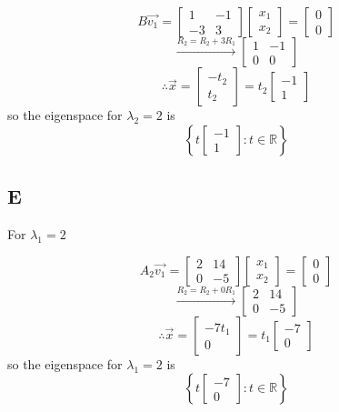 \documentclass{article}
\begin{document}
\[
	B \vec{v_1} =
	\begin{bmatrix}
		1  & -1 \\
		-3 & 3
	\end{bmatrix}
	\begin{bmatrix}
		x_1 \\
		x_2
	\end{bmatrix}
	=
	\begin{bmatrix}
		0 \\0
	\end{bmatrix}
\]
\[
	\xrightarrow{R_2 = R_2 + 3R_1}
	\begin{bmatrix}
		1 & -1 \\
		0 & 0
	\end{bmatrix}
\]
\[
	\therefore \vec{x} = \begin{bmatrix}
		-t_2 \\
		t_2
	\end{bmatrix}
	= t_2 \begin{bmatrix}
		-1 \\
		1
	\end{bmatrix}
\]
so the eigenspace for \(\lambda_2 = 2\) is
\[
	\left\{ t \begin{bmatrix}
		-1 \\
		1
	\end{bmatrix} : t \in \mathbb{R} \right\}
\]

\subsection*{E}

For \(\lambda_1 = 2\)

\[
    A_2 \vec{v_1} =
    \begin{bmatrix}
        2  & 14 \\
        0 & -5
    \end{bmatrix}
    \begin{bmatrix}
        x_1 \\
        x_2
    \end{bmatrix}
    =
    \begin{bmatrix}
        0 \\0
    \end{bmatrix}
\]
\[
    \xrightarrow{R_2 = R_2 + 0R_1}
    \begin{bmatrix}
        2 & 14 \\
        0 & -5
    \end{bmatrix}
\]
\[
    \therefore \vec{x} = \begin{bmatrix}
        -7t_1 \\
        0
    \end{bmatrix}
    = t_1 \begin{bmatrix}
        -7 \\
        0
    \end{bmatrix}
\]
so the eigenspace for \(\lambda_1 = 2\) is
\[
    \left\{ t \begin{bmatrix}
        -7 \\
        0
    \end{bmatrix} : t \in \mathbb{R} \right\}
\]
\end{document}
